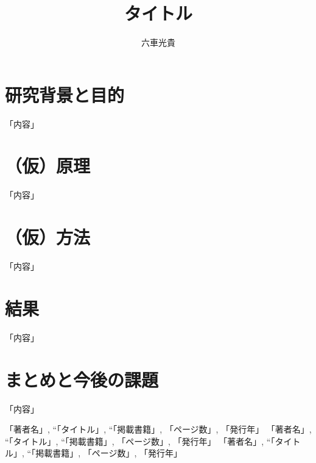 \documentclass[11pt]{abst5lab}
\title{タイトル}
\author{六車光貴}
\affil{京都大学生存圏研究所 橋口研究室}
\begin{document}
\maketitle

\thispagestyle{empty}

\section{研究背景と目的}


「内容」

\section{（仮）原理}



「内容」


\section{（仮）方法}
「内容」


\section{結果}
「内容」


\section{まとめと今後の課題}


「内容」

\begin{thebibliography}{9}
 
    「著者名」, ``「タイトル」, ``「掲載書籍」, 「ページ数」, 「発行年」 
   「著者名」, ``「タイトル」, ``「掲載書籍」, 「ページ数」, 「発行年」 
   「著者名」, ``「タイトル」, ``「掲載書籍」, 「ページ数」, 「発行年」 


\end{thebibliography}
\end{document}
